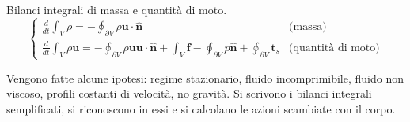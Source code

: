 \sol

\partone
  Bilanci integrali di massa e quantità di moto.
\begin{equation}
\begin{cases}
  \frac{d}{dt} \int_V \rho = -\oint_{\partial V} \rho \bm{u} \cdot \hat{\bm{n}}  & \text{(massa)} \\
  \frac{d}{dt} \int_V \rho \bm{u} = -\oint_{\partial V} \rho \bm{u} \bm{u} \cdot \hat{\bm{n}}
  +\int_V \bm{f} - \oint_{\partial V} p \hat{\bm{n}} + \oint_{\partial V} {\bm{t}_s} & \text{(quantità di moto)}
\end{cases}
\end{equation}



\parttwo
Vengono fatte alcune ipotesi: regime stazionario, fluido incomprimibile, fluido non viscoso, profili costanti di velocità, no gravità.
Si scrivono i bilanci integrali semplificati, si riconoscono in essi e si calcolano le azioni scambiate con il corpo.

